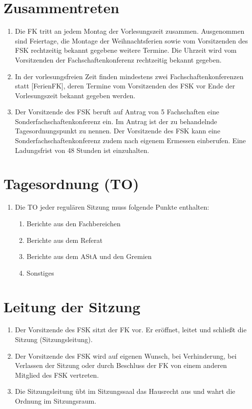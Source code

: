 \documentclass{article}
\begin{document}
\section{Zusammentreten}
\begin{enumerate}[(1)]
    \item Die FK tritt an jedem Montag der Vorlesungszeit zusammen.
    	Ausgenommen sind Feiertage,  die Montage der Weihnachtsferien sowie vom Vorsitzenden des FSK rechtzeitig bekannt gegebene weitere Termine.
    	Die Uhrzeit wird vom Vorsitzenden der Fachschaftenkonferenz rechtzeitig bekannt gegeben.
    \item In der vorlesungsfreien Zeit finden mindestens zwei Fachschaftenkonferenzen statt [FerienFK], deren Termine vom Vorsitzenden des FSK vor Ende der Vorlesungszeit bekannt gegeben werden.
    \item Der Vorsitzende des FSK beruft auf Antrag von 5 Fachschaften eine Sonderfachschaftenkonferenz ein.
    	Im Antrag ist der zu behandelnde Tagesordnungspunkt zu nennen. 
    	Der Vorsitzende des FSK kann eine Sonderfachschaftenkonferenz zudem nach eigenem Ermessen einberufen. 
    	Eine Ladungsfrist von 48 Stunden ist einzuhalten.    
\end{enumerate}

\section{Tagesordnung (TO)}
\begin{enumerate}[(1)]
    \item Die TO jeder regulären Sitzung muss folgende Punkte enthalten:
    \begin{enumerate}[1.]
        \item Berichte aus den Fachbereichen
        \item Berichte aus dem Referat
        \item Berichte aus dem AStA und den Gremien
        \item Sonstiges
    \end{enumerate}
\end{enumerate}

\section{Leitung der Sitzung}
\begin{enumerate}[(1)]
    \item Der Vorsitzende des FSK sitzt der FK vor. 
    	Er eröffnet, leitet und schließt die Sitzung (Sitzungsleitung).
    \item Der Vorsitzende des FSK wird auf eigenen Wunsch, bei Verhinderung, bei Verlassen der Sitzung oder durch Beschluss der FK von einem anderen Mitglied des FSK vertreten.
    \item Die Sitzungsleitung übt im Sitzungssaal das Hausrecht aus und wahrt die Ordnung im Sitzungsraum.
\end{enumerate}
\end{document}

